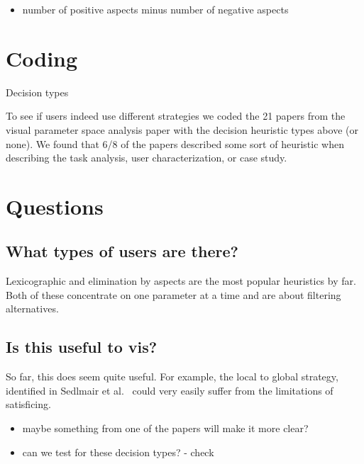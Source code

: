 \begin{itemize}
\tightlist
\item
  number of positive aspects minus number of negative aspects
\end{itemize}

\section{Coding}\label{coding}

\begin{table*}[htb!]
  \begin{center}
    \caption{Decision types}
  \end{center}
\end{table*}

To see if users indeed use different strategies we coded the 21 papers
from the visual parameter space analysis paper \citep{Sedlmair:2014}
with the decision heuristic types above (or none). We found that 6/8 of
the papers described some sort of heuristic when describing the task
analysis, user characterization, or case study.

\section{Questions}\label{questions}

\subsection{What types of users are
there?}\label{what-types-of-users-are-there}

Lexicographic and elimination by aspects are the most popular heuristics
by far. Both of these concentrate on one parameter at a time and are
about filtering alternatives.

\subsection{Is this useful to vis?}\label{is-this-useful-to-vis}

So far, this does seem quite useful. For example, the local to global
strategy, identified in Sedlmair et al.~\citep{Sedlmair:2014} could very
easily suffer from the limitations of satisficing.

\begin{itemize}
\tightlist
\item
  maybe something from one of the papers will make it more clear?
\item
  can we test for these decision types? - check
\end{itemize}

